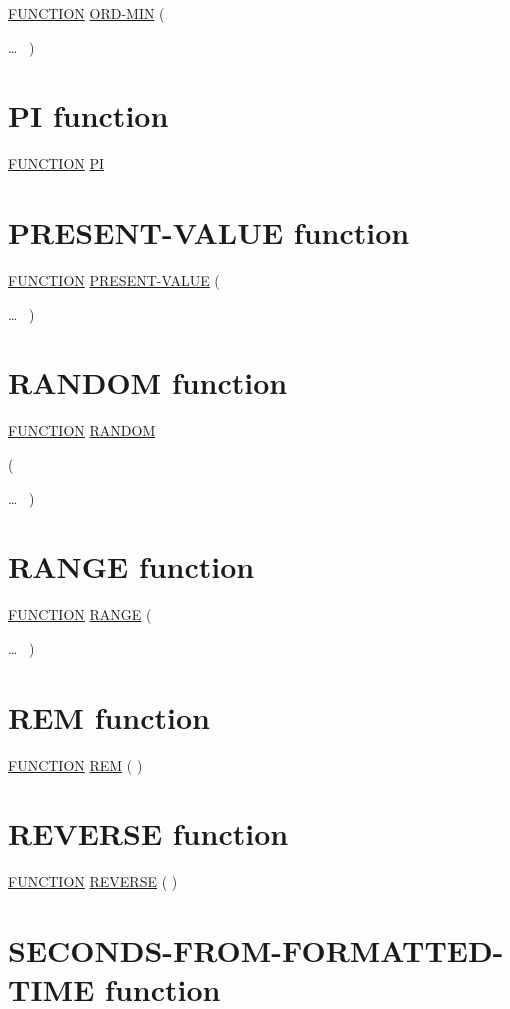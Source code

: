 \documentclass[a4paper,oneside,svgnames]{scrbook}
\makeatletter
\newcommand{\key}[1]{\underline{#1}}
\newcommand{\gnucobol}[1]{%
  \colorbox{orange!75}{#1}}
\newenvironment{0-1}{$\left[ \begin{tabular}{@{}l@{}}}{\end{tabular} \right]$}
\newenvironment{1=}{$\left\{ \begin{tabular}{@{}l@{}}}{\end{tabular} \right\}$}
\makeatother
\begin{document}
\key{FUNCTION} \key{ORD-MIN} (
\begin{1=}
  \argument
\end{1=} \ldots
\ {})

\section{PI function}

\key{FUNCTION} \key{PI}

\section{PRESENT-VALUE function}

\key{FUNCTION} \key{PRESENT-VALUE} (
\begin{1=}
  \argument
\end{1=} \ldots
\ {})

\section{RANDOM function}

\key{FUNCTION} \key{RANDOM}
\begin{0-1}
  (
  \begin{0-1}
    \argument
  \end{0-1} \gnucobol{\ldots}\ {}
  )
\end{0-1}

\section{RANGE function}

\key{FUNCTION} \key{RANGE} (
\begin{1=}
  \argument
\end{1=}\ldots
\ {})

\section{REM function}

\key{FUNCTION} \key{REM} ( \argument \argument )

\section{REVERSE function}

\key{FUNCTION} \key{REVERSE} ( \argument )

\section{SECONDS-FROM-FORMATTED-TIME function}
\end{document}
